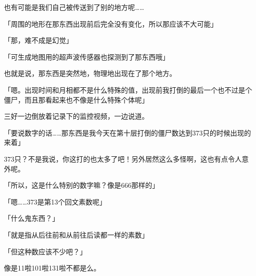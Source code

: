 也有可能是我们自己被传送到了别的地方呢……

「周围的地形在那东西出现前后完全没有变化，所以那应该不大可能」

「那，难不成是幻觉」

「可生成地图用的超声波传感器也探测到了那东西哦」

也就是说，那东西是突然地，物理地出现在了那个地方。

「嗯。出现时间和月相都不是什么特殊的值，出现前我打倒的最后一个也不过是个僵尸，而且那看起来也不像是什么特殊个体呢」

三好一边倒放着记录下的监控视频，一边说道。

「要说数字的话……那东西是我今天在第十层打倒的僵尸数达到373只的时候出现的来着」

373只？不是我说，你这打的也太多了吧！另外居然这么多怪啊，这也有点令人意外呢。

「所以，这是什么特别的数字嘛？像是666那样的」

「嗯……373是第13个回文素数呢」

「什么鬼东西？」

「就是指从后往前和从前往后读都一样的素数」

「但这种数应该不少吧？」

像是11啦101啦131啦不都是么。

